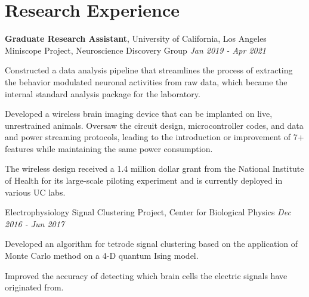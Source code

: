 \section{\mysidestyle Research Experience}
\textbf{Graduate Research Assistant}, University of California, Los Angeles\\
Miniscope Project, Neuroscience Discovery Group \hfill \textsl{Jan 2019 - Apr 2021}

\begin{list2}
    \item {Constructed a data analysis pipeline that streamlines the process of extracting the behavior modulated neuronal activities from raw data, which became the internal standard analysis package for the laboratory.}
    \item {Developed a wireless brain imaging device that can be implanted on live, unrestrained animals. Oversaw the circuit design, microcontroller codes, and data and power streaming protocols, leading to the introduction or improvement of 7+ features while maintaining the same power consumption.}
    \item {The wireless design received a 1.4 million dollar grant from the National Institute of Health for its large-scale piloting experiment and is currently deployed in various UC labs.}
\end{list2}



Electrophysiology Signal Clustering Project, Center for Biological Physics \hfill \textsl{Dec 2016 - Jun 2017}

\begin{list2}
    \item {Developed an algorithm for tetrode signal clustering based on the application of Monte Carlo method on a 4-D quantum Ising model.}
    \item {Improved the accuracy of detecting which brain cells the electric signals have originated from.}
\end{list2}


